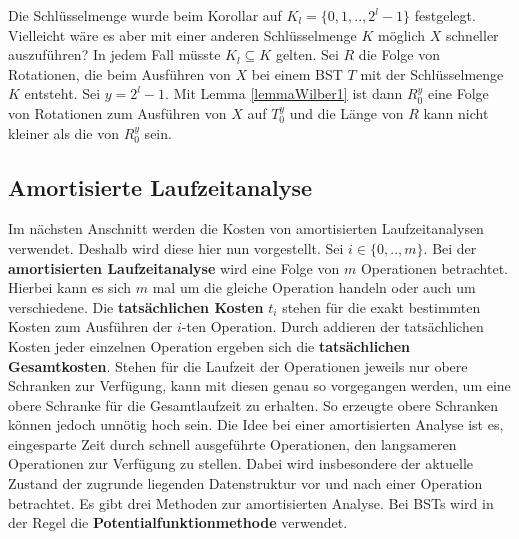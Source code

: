 \documentclass[a4paper,12pt]{article}
\begin{document}
\noindent Die Schlüsselmenge  wurde beim Korollar auf ${K_l = \{0,1,..,2^l -1\}}$ festgelegt. Vielleicht wäre es aber mit einer anderen Schlüsselmenge $K$ möglich $X$ schneller auszuführen? In jedem Fall müsste $K_l \subseteq K$ gelten. Sei $R$ die Folge von Rotationen, die beim Ausführen von $X$ bei einem BST $T$ mit der Schlüsselmenge $K$ entsteht. Sei $y = 2^l -1$. Mit Lemma \ref{lemmaWilber1} ist dann $R_0^y$ eine Folge von Rotationen zum Ausführen von $X$ auf $T_0^y$ und die Länge von $R$ kann nicht kleiner als die von $R_0^y$ sein. 



\subsection{Amortisierte Laufzeitanalyse}
Im nächsten Anschnitt werden die Kosten von amortisierten Laufzeitanalysen verwendet. Deshalb wird diese hier nun vorgestellt.
Sei $i \in \{0,..,m\}$. Bei der \textbf{amortisierten Laufzeitanalyse} wird eine Folge von $m$ Operationen betrachtet. Hierbei kann es sich $m$ mal um die gleiche Operation handeln oder auch um verschiedene. Die \textbf{tatsächlichen Kosten}  $t_i$ stehen für die exakt bestimmten Kosten zum Ausführen der $i$-ten Operation. Durch addieren der tatsächlichen Kosten jeder einzelnen Operation ergeben sich die \textbf{tatsächlichen Gesamtkosten}. Stehen für die Laufzeit der Operationen jeweils nur obere Schranken zur Verfügung, kann mit diesen genau so vorgegangen werden, um eine obere Schranke für die Gesamtlaufzeit zu erhalten. So erzeugte obere Schranken können jedoch unnötig hoch sein. Die Idee bei einer amortisierten Analyse ist es, eingesparte Zeit durch schnell ausgeführte Operationen, den langsameren Operationen zur Verfügung zu stellen. Dabei wird insbesondere der aktuelle Zustand der zugrunde liegenden Datenstruktur vor und nach einer Operation betrachtet. Es gibt drei Methoden zur amortisierten Analyse. Bei BSTs wird in der Regel die \textbf{Potentialfunktionmethode} verwendet.
\end{document}
